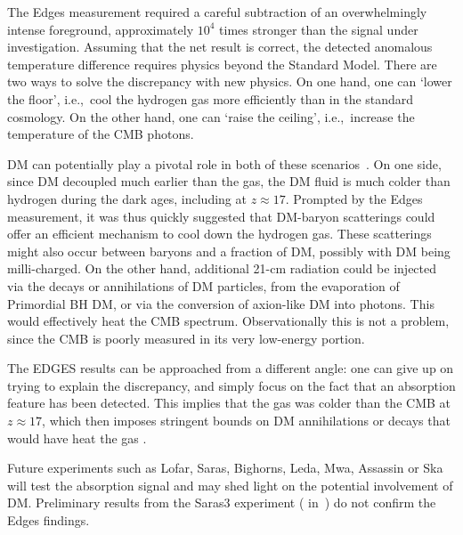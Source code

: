 \smallskip


The {\sc Edges} measurement  required a careful subtraction of an overwhelmingly intense foreground, approximately $10^4$ times stronger than the signal under investigation. 
Assuming that the net result is correct, the detected anomalous temperature difference requires physics beyond the Standard Model. There are two ways to solve the discrepancy with new physics. On one hand, one can `lower the floor', i.e.,~cool the hydrogen gas more efficiently than in the standard cosmology. On the other hand, one can `raise the ceiling', i.e.,~increase the temperature of the CMB photons. 


\medskip

DM can potentially play a pivotal role in both of these scenarios~\cite{EDGES}. On one side, since DM decoupled much earlier than the gas, the DM fluid is much colder than hydrogen during the dark ages, including at $z \approx 17$. 
Prompted by the {\sc Edges} measurement, it was thus quickly suggested that DM-baryon scatterings could offer an efficient mechanism to cool down the hydrogen gas. 
 These scatterings might also occur between baryons and a fraction of DM, possibly with DM being milli-charged. 
On the other hand, additional 21-cm radiation could be injected via the decays or annihilations of DM particles, from the evaporation of Primordial BH DM, or via the conversion of axion-like DM into photons. This would effectively heat the CMB spectrum. Observationally this is not a problem, since the CMB is poorly measured in its very low-energy portion.


The {\sc EDGES} results can be approached from a different angle:
one can give up on trying to explain the discrepancy, and simply focus on the fact that an absorption feature has been detected. This implies that the gas was colder than the CMB at $z \approx 17$, which then imposes stringent bounds on DM annihilations or decays that would have heat the gas \cite{EDGESbounds}. 

\medskip


Future experiments such as {\sc Lofar}, {\sc Saras}, {\sc Bighorns}, {\sc Leda}, {\sc Mwa}, {\sc Assassin} or {\sc Ska} \cite{EDGESexp} will test the absorption signal and may shed light on the potential involvement of DM. 
Preliminary results from the {\sc Saras3} experiment  ( in~\cite{EDGESexp}) do not confirm the {\sc Edges} findings.




\setlength{}

